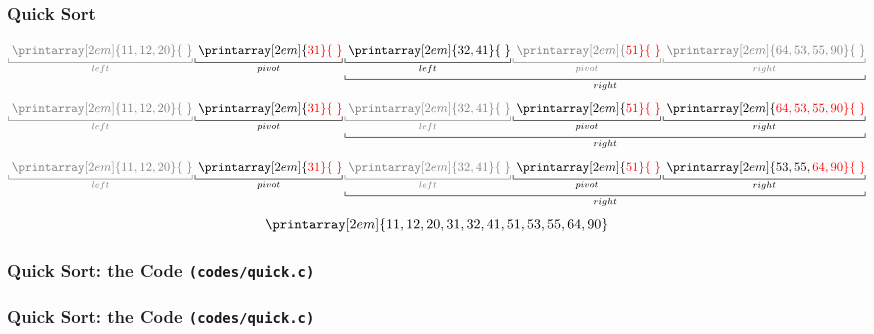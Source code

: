 \documentclass[newPxFont,sthlmFooter,nooffset]{beamer}
\begin{document}
\begin{frame}[t, fragile]
  \frametitle{Quick Sort}
\[
{\color{black!50}\underbracket[0.5pt]{{\thickspace}\printarray[2em]{11, 12, 20}{\thickspace}}_{left}}
\underbracket[0.5pt]{{\thickspace}\printarray[2em]{\color{red}31}{\thickspace}}_{pivot}
\underbracket[0.5pt]{
\underbracket[0.5pt]{{\thickspace}\printarray[2em]{32, 41}{\thickspace}}_{left} 
{\color{black!50}
  \underbracket[0.5pt]{{\thickspace}\printarray[2em]{\color{red}51}{\thickspace}}_{pivot}
  \underbracket[0.5pt]{{\thickspace}\printarray[2em]{64, 53, 55, 90}{\thickspace}}_{right}
}
}_{right}
\]\pause
\[
{\color{black!50}\underbracket[0.5pt]{{\thickspace}\printarray[2em]{11, 12, 20}{\thickspace}}_{left}}
\underbracket[0.5pt]{{\thickspace}\printarray[2em]{\color{red}31}{\thickspace}}_{pivot}
\underbracket[0.5pt]{
{\color{black!50}
   \underbracket[0.5pt]{{\thickspace}\printarray[2em]{32, 41}{\thickspace}}_{left} 
}
  \underbracket[0.5pt]{{\thickspace}\printarray[2em]{\color{red}51}{\thickspace}}_{pivot}
  \underbracket[0.5pt]{{\thickspace}\printarray[2em]{\color{red}64, 53, 55, 90}{\thickspace}}_{right}
}_{right}
\]\pause
\[
{\color{black!50}\underbracket[0.5pt]{{\thickspace}\printarray[2em]{11, 12, 20}{\thickspace}}_{left}}
\underbracket[0.5pt]{{\thickspace}\printarray[2em]{\color{red}31}{\thickspace}}_{pivot}
\underbracket[0.5pt]{
{\color{black!50}
   \underbracket[0.5pt]{{\thickspace}\printarray[2em]{32, 41}{\thickspace}}_{left} 
}
  \underbracket[0.5pt]{{\thickspace}\printarray[2em]{\color{red}51}{\thickspace}}_{pivot}
  \underbracket[0.5pt]{{\thickspace}\printarray[2em]{53, 55, \color{red}64, 90}{\thickspace}}_{right}
}_{right}
\]\pause
\[
\printarray[2em]{11, 12, 20, 31, 32, 41, 51, 53, 55, 64 ,90}
\]


\end{frame}

\begin{frame}[t, fragile]
  \frametitle{Quick Sort: the Code \texttt{(codes/quick.c)}}
  
  
\end{frame}

\begin{frame}[t, fragile]
  \frametitle{Quick Sort: the Code \texttt{(codes/quick.c)}}
  
  
\end{frame}
\end{document}
